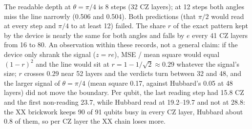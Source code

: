 The readable depth at $\theta = \pi/4$ is 8 steps (32 CZ layers); at 12 steps both angles miss the line narrowly
(0.506 and 0.504). Both predictions (that $\pi/2$ would read at every step and $\pi/4$ to at least 12) failed. The share
$r$ of the exact pattern kept by the device is nearly the same for both angles and falls by $e$ every 41 CZ layers from
16 to 80. An observation within these records, not a general claim: if the device only shrank the signal ($z = r e$),
MSE / mean square would equal $(1-r)^2$ and the line would sit at $r = 1 - 1/\sqrt2 \approx 0.29$ whatever the signal's
size; $r$ crosses 0.29 near 52 layers and the verdicts turn between 32 and 48, and the larger signal of $\theta = \pi/4$
(mean square 0.17, against Hubbard's 0.05 at 48 layers) did not move the boundary. Per qubit, the last reading step
had 15.8 CZ and the first non-reading 23.7, while Hubbard read at 19.2--19.7 and not at 28.8: the XX brickwork keeps 90
of 91 qubits busy in every CZ layer, Hubbard about 0.8 of them, so per CZ layer the XX chain loses more.

